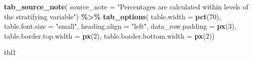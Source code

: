 \documentclass[
]{article}
\newenvironment{Shaded}{\begin{snugshade}}{\end{snugshade}}
\newcommand{\AttributeTok}[1]{\textcolor[rgb]{0.13,0.29,0.53}{#1}}
\newcommand{\DecValTok}[1]{\textcolor[rgb]{0.00,0.00,0.81}{#1}}
\newcommand{\FunctionTok}[1]{\textcolor[rgb]{0.13,0.29,0.53}{\textbf{#1}}}
\newcommand{\NormalTok}[1]{#1}
\newcommand{\SpecialCharTok}[1]{\textcolor[rgb]{0.81,0.36,0.00}{\textbf{#1}}}
\newcommand{\StringTok}[1]{\textcolor[rgb]{0.31,0.60,0.02}{#1}}
\begin{document}
\begin{Shaded}
\begin{Highlighting}[]
  \FunctionTok{tab\_source\_note}\NormalTok{(}
    \AttributeTok{source\_note =} \StringTok{"Percentages are calculated within levels of the stratifying }
\StringTok{    variable"}\NormalTok{) }\SpecialCharTok{\%\textgreater{}\%} 
  \FunctionTok{tab\_options}\NormalTok{(}
    \AttributeTok{table.width =} \FunctionTok{pct}\NormalTok{(}\DecValTok{70}\NormalTok{),}
    \AttributeTok{table.font.size =} \StringTok{"small"}\NormalTok{,}
    \AttributeTok{heading.align =} \StringTok{"left"}\NormalTok{,}
    \AttributeTok{data\_row.padding =} \FunctionTok{px}\NormalTok{(}\DecValTok{3}\NormalTok{),}
    \AttributeTok{table.border.top.width =} \FunctionTok{px}\NormalTok{(}\DecValTok{2}\NormalTok{),}
    \AttributeTok{table.border.bottom.width =} \FunctionTok{px}\NormalTok{(}\DecValTok{2}\NormalTok{))}

\NormalTok{tbl1}
\end{Highlighting}
\end{Shaded}
\end{document}
